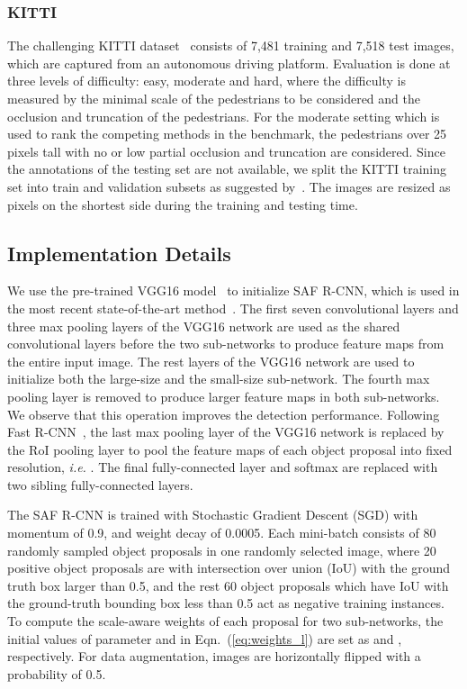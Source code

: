 \documentclass[journal]{IEEEtran}
\begin{document}
\subsubsection{KITTI}
The challenging KITTI dataset~\cite{geiger2012we} consists of 7,481 training and 7,518 test images, which are captured from an autonomous driving platform. Evaluation is done at three levels of difficulty: easy, moderate and hard, where the difficulty is measured by the minimal scale of the pedestrians to be considered and the occlusion and truncation of the pedestrians. For the moderate setting which is used to rank the competing methods in the benchmark, the pedestrians over 25 pixels tall with no or low partial occlusion and truncation are considered. Since the annotations of the testing set are not available, we split the KITTI training set into train and validation subsets as suggested by~\cite{chen20153d}. The images are resized as  pixels on the shortest side during the training and testing time.  


\subsection{Implementation Details}
We use the pre-trained VGG16 model~\cite{simonyan2014very} to initialize SAF R-CNN, which is used in the most recent state-of-the-art method~\cite{compact}. The first seven convolutional layers and three max pooling layers of the VGG16 network are used as the shared convolutional layers before the two sub-networks to produce feature maps from the entire input image. The rest layers of the VGG16 network are used to initialize both the large-size and the small-size sub-network. The fourth max pooling layer is removed to produce larger feature maps in both sub-networks. We observe that this operation improves the  detection performance. Following Fast R-CNN~\cite{girshick2015fast}, the last max pooling layer of the VGG16 network is replaced by the RoI pooling layer to pool the feature maps of each object proposal into fixed resolution, \emph{i.e.} . The final fully-connected layer and softmax are replaced with two sibling fully-connected layers.

The SAF R-CNN is trained with Stochastic Gradient Descent (SGD) with momentum of 0.9, and weight decay of 0.0005. Each mini-batch consists of 80 randomly sampled object proposals in one randomly selected image, where 20 positive object proposals are with intersection over union (IoU) with the ground truth box larger than 0.5, and the rest 60 object proposals which have IoU with the ground-truth bounding box less than 0.5 act as negative training instances. To compute the scale-aware weights of each proposal for two sub-networks, the initial values of parameter  and  in Eqn.~(\ref{eq:weights_l}) are set as  and , respectively.
For data augmentation, images are horizontally flipped with a probability of 0.5.
\end{document}
